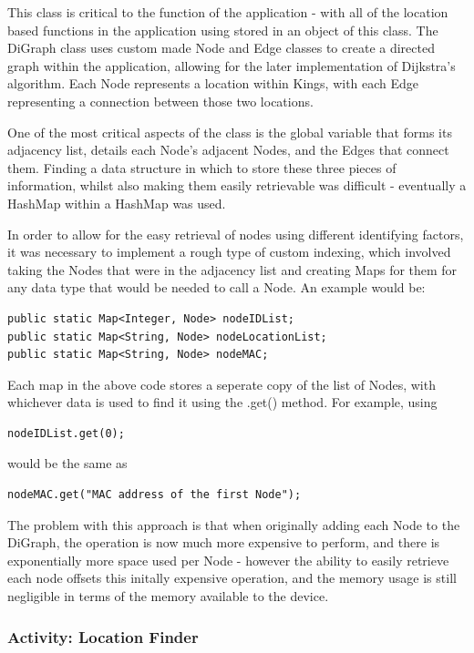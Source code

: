 \documentclass[11pt]{informatics-report}
\begin{document}
This class is critical to the function of the application - with all of the location based functions in the application using stored in an object of this class. The DiGraph class uses custom made Node and Edge classes to create a directed graph within the application, allowing for the later implementation of Dijkstra's algorithm. Each Node represents a location within Kings, with each Edge representing a connection between those two locations.

One of the most critical aspects of the class is the global variable that forms its adjacency list, details each Node's adjacent Nodes, and the Edges that connect them. Finding a data structure in which to store these three pieces of information, whilst also making them easily retrievable was difficult - eventually a HashMap within a HashMap was used. 

In order to allow for the easy retrieval of nodes using different identifying factors, it was necessary to implement a rough type of custom indexing, which involved taking the Nodes that were in the adjacency list and creating Maps for them for any data type that would be needed to call a Node. An example would be:

\begin{verbatim}
public static Map<Integer, Node> nodeIDList;
public static Map<String, Node> nodeLocationList;
public static Map<String, Node> nodeMAC;  
\end{verbatim}

Each map in the above code stores a seperate copy of the list of Nodes, with whichever data is used to find it using the .get() method. For example, using 

\begin{verbatim}
nodeIDList.get(0);
\end{verbatim}
would be the same as

\begin{verbatim}
nodeMAC.get("MAC address of the first Node");
\end{verbatim}

The problem with this approach is that when originally adding each Node to the DiGraph, the operation is now much more expensive to perform, and there is exponentially more space used per Node - however the ability to easily retrieve each node offsets this initally expensive operation, and the memory usage is still negligible in terms of the memory available to the device.

\subsubsection{Activity: Location Finder}
\end{document}
